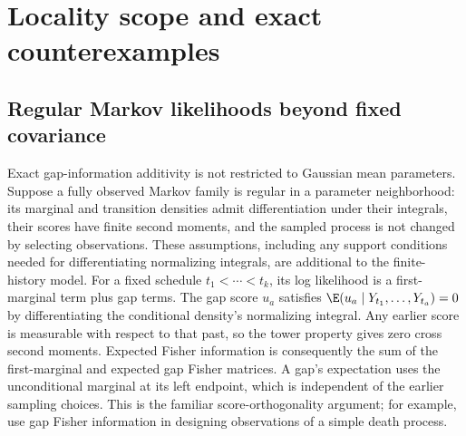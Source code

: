 \section{Locality scope and exact counterexamples}
\label{app:locality-scope}

\subsection{Regular Markov likelihoods beyond fixed covariance}
\label{app:markov-scope}
Exact gap-information additivity is not restricted to Gaussian mean
parameters. Suppose a fully observed Markov family is regular in a
parameter neighborhood: its marginal and transition densities admit
differentiation under their integrals, their scores have finite second
moments, and the sampled process is not changed by selecting observations.
These assumptions, including any support conditions needed for differentiating
normalizing integrals, are additional to the finite-history model.
For a fixed schedule $t_1<\cdots<t_k$, its log likelihood is a first-marginal
term plus gap terms. The gap score $u_a$ satisfies
$\E(u_a\mid Y_{t_1},\ldots,Y_{t_a})=0$ by differentiating the conditional
density's normalizing integral. Any earlier score is measurable with respect
to that past, so the tower property gives zero cross second moments.
Expected Fisher information is consequently the sum of the first-marginal
and expected gap Fisher matrices. A gap's expectation uses the unconditional
marginal at its left endpoint, which is independent of the earlier sampling
choices. This is the familiar score-orthogonality argument; for example,
\citet[Section 2]{Pagendam2010} use gap Fisher information in designing
observations of a simple death process.

